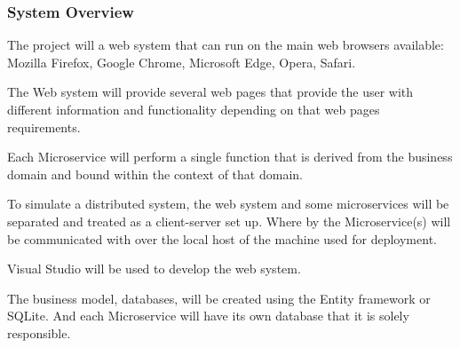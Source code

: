 \subsubsection{System Overview}
The project will a web system that can run on the main web browsers available: Mozilla Firefox, Google Chrome, Microsoft Edge, Opera, Safari.

The Web system will provide several web pages that provide the user with different information and functionality depending on that web pages requirements.

Each Microservice will perform a single function that is derived from the business domain and bound within the context of that domain.

To simulate a distributed system, the web system and some microservices will be separated and treated as a client-server set up. Where by the Microservice(s) will be communicated with over the local host of the machine used for deployment.

Visual Studio will be used to develop the web system. 

The business model, databases, will be created using the Entity framework or SQLite. And each Microservice will have its own database that it is solely responsible.
